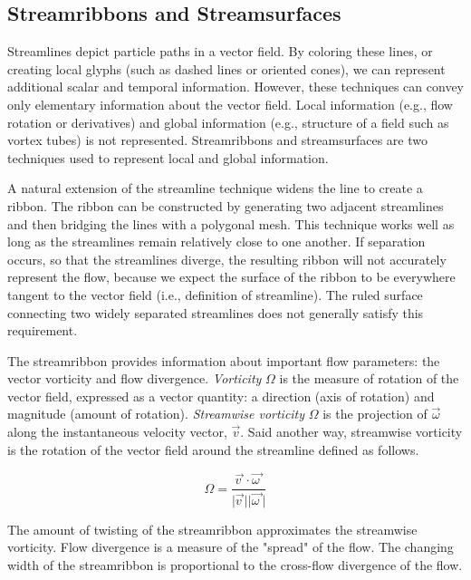 \subsection{Streamribbons and Streamsurfaces}

Streamlines depict particle paths in a vector field. By coloring these lines, or creating local glyphs (such as dashed lines or oriented cones), we can represent additional scalar and temporal information. However, these techniques can convey only elementary information about the vector field. Local information (e.g., flow rotation or derivatives) and global information (e.g., structure of a field such as vortex tubes) is not represented. Streamribbons and streamsurfaces are two techniques used to represent local and global information.

A natural extension of the streamline technique widens the line to create a ribbon. The ribbon can be constructed by generating two adjacent streamlines and then bridging the lines with a polygonal mesh. This technique works well as long as the streamlines remain relatively close to one another. If separation occurs, so that the streamlines diverge, the resulting ribbon will not accurately represent the flow, because we expect the surface of the ribbon to be everywhere tangent to the vector field (i.e., definition of streamline). The ruled surface connecting two widely separated streamlines does not generally satisfy this requirement.

The streamribbon provides information about important flow parameters: the vector vorticity and flow divergence. \emph{Vorticity} $\Omega$ is the measure of rotation of the vector field, expressed as a vector quantity: a direction (axis of rotation) and magnitude (amount of rotation). \emph{Streamwise vorticity} $\Omega$ is the projection of $\overrightarrow{\omega}$ along the instantaneous velocity vector, $\overrightarrow{v}$. Said another way, streamwise vorticity is the rotation of the vector field around the streamline defined as follows.

\begin{equation}\label{eq:9.3}
\Omega = \frac{\overrightarrow{v\ } \cdot \overrightarrow{\omega\ }}{\vert \overrightarrow{v\ } \vert \vert \overrightarrow{\omega\ } \vert}
\end{equation}

The amount of twisting of the streamribbon approximates the streamwise vorticity. Flow divergence is a measure of the "spread" of the flow. The changing width of the streamribbon is proportional to the cross-flow divergence of the flow.

